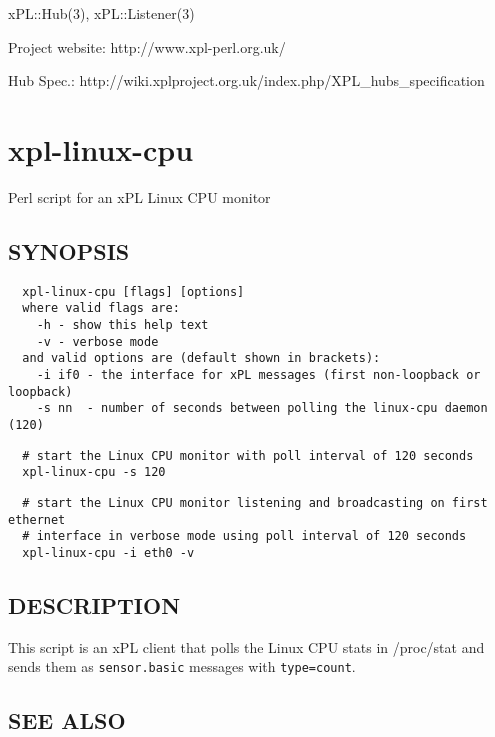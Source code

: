 xPL::Hub(3), xPL::Listener(3)



Project website: http://www.xpl-perl.org.uk/



Hub Spec.: http://wiki.xplproject.org.uk/index.php/XPL\_hubs\_specification

\section{xpl-linux-cpu\label{xpl-linux-cpu}}


Perl script for an xPL Linux CPU monitor

\subsection*{SYNOPSIS\label{xpl-linux-cpu_SYNOPSIS}}
\begin{verbatim}
  xpl-linux-cpu [flags] [options]
  where valid flags are:
    -h - show this help text
    -v - verbose mode
  and valid options are (default shown in brackets):
    -i if0 - the interface for xPL messages (first non-loopback or loopback)
    -s nn  - number of seconds between polling the linux-cpu daemon (120)
\end{verbatim}
\begin{verbatim}
  # start the Linux CPU monitor with poll interval of 120 seconds
  xpl-linux-cpu -s 120
\end{verbatim}
\begin{verbatim}
  # start the Linux CPU monitor listening and broadcasting on first ethernet
  # interface in verbose mode using poll interval of 120 seconds
  xpl-linux-cpu -i eth0 -v
\end{verbatim}
\subsection*{DESCRIPTION\label{xpl-linux-cpu_DESCRIPTION}}


This script is an xPL client that polls the Linux CPU stats in /proc/stat
and sends them as \texttt{sensor.basic} messages with \texttt{type=count}.

\subsection*{SEE ALSO\label{xpl-linux-cpu_SEE_ALSO}}


